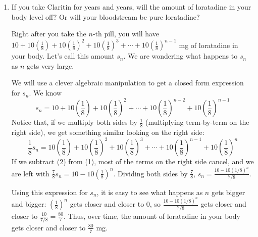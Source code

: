 \documentclass[main]{subfiles}
\begin{document}
\begin{enumerate}
\begin{enumerate}
\begin{solution}
      Continuing this reasoning, you will have $10 + 10 \left( \frac{1}{8}
      \right) + 10 \left( \frac{1}{8} \right)^2+ 10 \left( \frac{1}{8}
      \right)^3 + 10 \left( \frac{1}{8} \right)^4+ 10 \left( \frac{1}{8}
      \right)^5 + 10 \left( \frac{1}{8} \right)^6$ mg in your body after
      the 7th pill.
      \end{solution}

      \item
      \begin{problem}[\vfill\vfill\vfill]
      If you take Claritin for years and years, will the amount of
      loratadine in your body level off?  Or will your bloodstream be pure
      loratadine?
      \end{problem}

      \begin{solution}
      Right after you take the $n$-th pill, you will have $10 + 10 \left(
      \frac{1}{8} \right) + 10 \left( \frac{1}{8} \right)^2 + 10 \left(
      \frac{1}{8} \right)^3 + \cdots + 10 \left( \frac{1}{8}
      \right)^{n-1}$ mg of loratadine in your body.  Let's call this
      amount $s_n$.  We are wondering what happens to $s_n$ as $n$ gets
      very large.

      We will use a clever algebraic manipulation to get a closed form expression for $s_n$.  We
      know
      \begin{equation}
      s_n = 10 + 10 \left( \frac{1}{8} \right) + 10 \left( \frac{1}{8}
      \right)^2 + \cdots + 10 \left( \frac{1}{8} \right)^{n-2} + 
      10 \left( \frac{1}{8} \right)^{n-1}
      \end{equation}
      Notice that, if we multiply both sides by $\frac{1}{8}$ (multiplying
      term-by-term on the right side), we get something similar looking on
      the right side:
      \begin{equation}
      \frac{1}{8} s_n = 10 \left(
      \frac{1}{8} \right) + 10 \left( \frac{1}{8} \right)^2 + 10
      \left( \frac{1}{8} \right)^3 + \cdots + 10 \left( \frac{1}{8}
      \right)^{n-1} + 10 \left( \frac{1}{8} \right)^n
      \end{equation}
      If we subtract (2) from (1), most of the terms on
      the right side cancel, and we are left with $\displaystyle
      \frac{7}{8} s_n = 10 - 10 \left( \frac{1}{8} \right)^n$.  Dividing
      both sides by $\displaystyle \frac{7}{8}$, $\displaystyle s_n =
      \frac{10 - 10(1/8)^n}{7/8}$.

      Using this expression for $s_n$, it is easy to see what happens as
      $n$ gets bigger and bigger: $\left( \frac{1}{8} \right)^n$ gets
      closer and closer to 0, so $\frac{10 - 10(1 / 8)^n}{7 / 8}$ gets
      closer and closer to $\frac{10}{7 / 8} = \frac{80}{7}$.  Thus, over
      time, the amount of loratadine in your body gets closer and closer
      to $\frac{80}{7}$ mg.


\end{solution}
\end{enumerate}
\end{enumerate}
\end{document}
